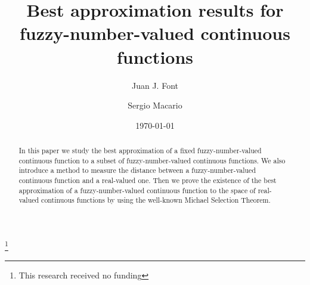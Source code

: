 \documentclass[12pt]{amsart}
\begin{document}
\title[Best approximation]{Best approximation results for fuzzy-number-valued continuous functions}



\author{Juan J. Font}
\address{Institut Universitari
de Matem\`{a}tiques i Aplicacions de Castell\'{o} (IMAC),
Universitat Jaume I, Avda. Sos Baynat s/n, 12071, Castell\'{o}
(Spain).}
\thanks{This research received no funding}


\author{Sergio Macario}

\address{Institut Universitari
de Matem\`{a}tiques i Aplicacions de Castell\'{o} (IMAC),
Universitat Jaume I, Avda. Sos Baynat s/n, 12071, Castell\'{o}
(Spain).}



\keywords{}

\date{\today}




%


%




\begin{abstract}
In this paper we study the best approximation of a fixed fuzzy-number-valued continuous function to a subset of fuzzy-number-valued continuous functions. We also introduce a method to measure the distance between a fuzzy-number-valued continuous function and a real-valued one. Then we prove the existence of the best approximation of a fuzzy-number-valued continuous function to the space of real-valued continuous functions by using the well-known Michael Selection Theorem.
\end{abstract}

\maketitle
\end{document}
